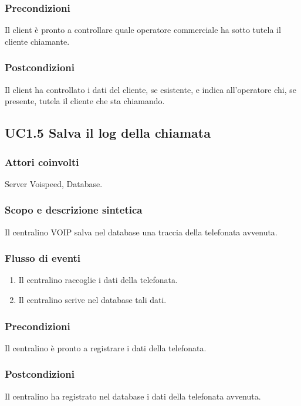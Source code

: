 \subsubsection*{Precondizioni} Il client \`e pronto a controllare quale operatore commerciale ha sotto tutela il cliente chiamante.
\subsubsection*{Postcondizioni} Il client ha controllato i dati del cliente, se esistente, e indica all'operatore chi, se presente, tutela il cliente che sta chiamando.

\subsection*{UC1.5 Salva il log della chiamata}
\subsubsection*{Attori coinvolti} Server Voispeed, Database.
\subsubsection*{Scopo e descrizione sintetica}
Il centralino VOIP salva nel database una traccia della telefonata avvenuta.
\subsubsection*{Flusso di eventi}
\begin{enumerate}
\item Il centralino raccoglie i dati della telefonata.
\item Il centralino scrive nel database tali dati.
\end{enumerate}
\subsubsection*{Precondizioni} Il centralino \`e pronto a registrare i dati della telefonata.
\subsubsection*{Postcondizioni} Il centralino ha registrato nel database i dati della telefonata avvenuta.

\newpage
